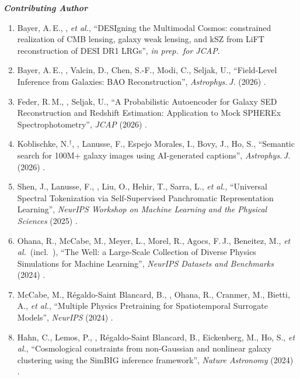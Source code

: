 \textbf{\textit{Contributing Author}}
\begin{enumerate}[resume]
    \item Bayer, A.\,E., \me, \textit{et al.}, ``DESIgning the Multimodal Cosmos: constrained realization of CMB lensing, galaxy weak lensing, and kSZ from LiFT reconstruction of DESI DR1 LRGs'', \textit{in prep.\ for JCAP}.
    \item Bayer, A.\,E., \me, Valcin, D., Chen, S.-F., Modi, C., Seljak, U., ``Field-Level Inference from Galaxies: BAO Reconstruction'', \textit{Astrophys.\,J.} (2026) .
    \item Feder, R.\,M., \me, Seljak, U., ``A Probabilistic Autoencoder for Galaxy SED Reconstruction and Redshift Estimation: Application to Mock SPHEREx Spectrophotometry'', \textit{JCAP} (2026) .
    \item Koblischke, N.$^\dagger$, \me, Lanusse, F., Espejo Morales, I., Bovy, J., Ho, S., ``Semantic search for 100M+ galaxy images using AI-generated captions'', \textit{Astrophys.\,J.} (2026) .
    \item Shen, J., Lanusse, F., \me, Liu, O., Hehir, T., Sarra, L., \textit{et al.}, ``Universal Spectral Tokenization via Self-Supervised Panchromatic Representation Learning'', \textit{NeurIPS Workshop on Machine Learning and the Physical Sciences} (2025) .
    \item Ohana, R., McCabe, M., Meyer, L., Morel, R., Agocs, F.\,J., Beneitez, M., \textit{et al.}\ (incl.\ \me), ``The Well: a Large-Scale Collection of Diverse Physics Simulations for Machine Learning'', \textit{NeurIPS Datasets and Benchmarks} (2024) .
    \item McCabe, M., R\'{e}galdo-Saint Blancard, B., \me, Ohana, R., Cranmer, M., Bietti, A., \textit{et al.}, ``Multiple Physics Pretraining for Spatiotemporal Surrogate Models'', \textit{NeurIPS} (2024) .
    \item Hahn, C., Lemos, P., \me, R\'{e}galdo-Saint Blancard, B., Eickenberg, M., Ho, S., \textit{et al.}, ``Cosmological constraints from non-Gaussian and nonlinear galaxy clustering using the SimBIG inference framework'', \textit{Nature Astronomy} (2024) .
\end{enumerate}

